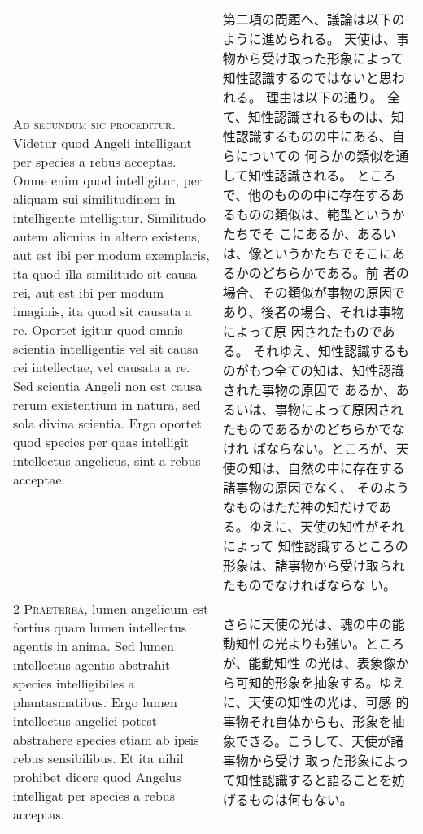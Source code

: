 \documentclass[10pt]{jsarticle} %
\begin{document}
\begin{longtable}{p{21em}p{21em}}

{\huge A}{\scshape d secundum sic proceditur}. Videtur quod Angeli
intelligant per species a rebus acceptas. Omne enim quod intelligitur,
per aliquam sui similitudinem in intelligente intelligitur. Similitudo
autem alicuius in altero existens, aut est ibi per modum exemplaris, ita
quod illa similitudo sit causa rei, aut est ibi per modum imaginis, ita
quod sit causata a re. Oportet igitur quod omnis scientia intelligentis
vel sit causa rei intellectae, vel causata a re. Sed scientia Angeli non
est causa rerum existentium in natura, sed sola divina scientia. Ergo
oportet quod species per quas intelligit intellectus angelicus, sint a
rebus acceptae.

&

第二項の問題へ、議論は以下のように進められる。
 天使は、事物から受け取った形象によって知性認識するのではないと思われる。
 理由は以下の通り。
 全て、知性認識されるものは、知性認識するものの中にある、自らについての
 何らかの類似を通して知性認識される。
 ところで、他のものの中に存在するあるものの類似は、範型というかたちでそ
 こにあるか、あるいは、像というかたちでそこにあるかのどちらかである。前
 者の場合、その類似が事物の原因であり、後者の場合、それは事物によって原
 因されたものである。
 それゆえ、知性認識するものがもつ全ての知は、知性認識された事物の原因で
 あるか、あるいは、事物によって原因されたものであるかのどちらかでなけれ
 ばならない。ところが、天使の知は、自然の中に存在する諸事物の原因でなく、
 そのようなものはただ神の知だけである。ゆえに、天使の知性がそれによって
 知性認識するところの形象は、諸事物から受け取られたものでなければならな
 い。

 \\


{\scshape 2 Praeterea}, lumen angelicum est fortius quam lumen
intellectus agentis in anima. Sed lumen intellectus agentis abstrahit
species intelligibiles a phantasmatibus. Ergo lumen intellectus angelici
potest abstrahere species etiam ab ipsis rebus sensibilibus. Et ita
nihil prohibet dicere quod Angelus intelligat per species a rebus
acceptas.

&

 さらに天使の光は、魂の中の能動知性の光よりも強い。ところが、能動知性
 の光は、表象像から可知的形象を抽象する。ゆえに、天使の知性の光は、可感
 的事物それ自体からも、形象を抽象できる。こうして、天使が諸事物から受け
 取った形象によって知性認識すると語ることを妨げるものは何もない。

\\



\end{longtable}
\end{document}

